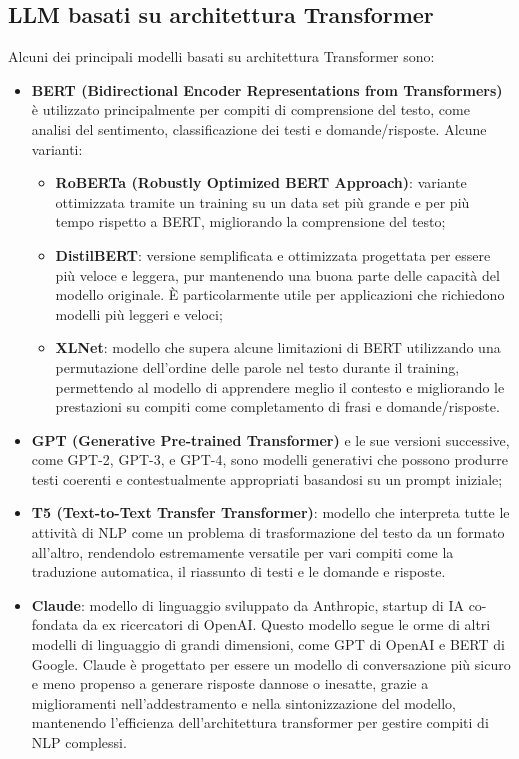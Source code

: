    \subsection{LLM basati su architettura Transformer}
        Alcuni dei principali modelli basati su architettura Transformer sono:
        \begin{itemize}
            \item \textbf{BERT (Bidirectional Encoder Representations from Transformers)} è utilizzato principalmente per compiti di comprensione del testo, come analisi del sentimento, classificazione dei testi e domande/risposte. Alcune varianti:
            \begin{itemize}
                \item \textbf{RoBERTa (Robustly Optimized BERT Approach)}: variante ottimizzata tramite un training su un data set più grande e per più tempo rispetto a BERT, migliorando la comprensione del testo;
                
               \item \textbf{ DistilBERT}: versione semplificata e ottimizzata progettata per essere più veloce e leggera, pur mantenendo una buona parte delle capacità del modello originale. È particolarmente utile per applicazioni che richiedono modelli più leggeri e veloci;
                
                \item \textbf{XLNet}: modello che supera alcune limitazioni di BERT utilizzando una permutazione dell'ordine delle parole nel testo durante il training, permettendo al modello di apprendere meglio il contesto e migliorando le prestazioni su compiti come completamento di frasi e domande/risposte.
            \end{itemize}
            
            \item \textbf{GPT (Generative Pre-trained Transformer)} e le sue versioni successive, come GPT-2, GPT-3, e GPT-4, sono modelli generativi che possono produrre testi coerenti e contestualmente appropriati basandosi su un prompt iniziale;
            
            \item \textbf{T5 (Text-to-Text Transfer Transformer)}: modello che interpreta tutte le attività di NLP come un problema di trasformazione del testo da un formato all'altro, rendendolo estremamente versatile per vari compiti come la traduzione automatica, il riassunto di testi e le domande e risposte.
            
            \item \textbf{Claude}: modello di linguaggio sviluppato da Anthropic, startup di IA co-fondata da ex ricercatori di OpenAI. Questo modello segue le orme di altri modelli di linguaggio di grandi dimensioni, come GPT di OpenAI e BERT di Google. Claude è progettato per essere un modello di conversazione più sicuro e meno propenso a generare risposte dannose o inesatte, grazie a miglioramenti nell'addestramento e nella sintonizzazione del modello, mantenendo l'efficienza dell'architettura transformer per gestire compiti di NLP complessi.
        \end{itemize}
        
